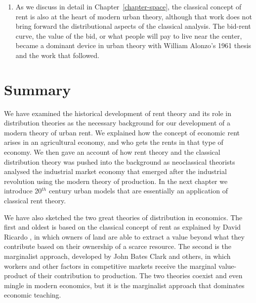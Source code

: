 \begin{enumerate}
    \item As we discuss in detail in Chapter~\ref{chapter-space}, the classical concept of rent is also at the heart of modern urban theory, although that work does not bring forward the distributional aspects of the classical analysis. The \gls{bid-rent curve}, the value of the bid, or what people will pay to live near the center, became a dominant device in urban theory with William Alonzo's 1961 thesis \cite{alonzoTheoryUrbanLand1960} and the work that followed. %
\end{enumerate}

 
\section{Summary}



We have examined the historical development  of rent theory and its role in distribution theories as the necessary background for our development of a modern theory of urban rent. We explained how the concept of economic rent arises in an agricultural economy, and who gets the rents in that type of economy. We then gave an account of how rent theory and the classical distribution theory was pushed into the background as neoclassical theorists analysed the industrial market economy that emerged after the industrial revolution using the  modern theory of production. In the next chapter we introduce 20$^{th}$ century urban models that are essentially an application of classical rent theory.


We have also sketched the  two great theories of \gls{distribution} in economics. The first and oldest is based on the classical concept of rent as explained  by David Ricardo \cite{ricardoEssayInfluenceLow1815}, in which owners of land are able to extract a value beyond what they contribute based on their ownership of a scarce resource. The second is the marginalist approach, developed by John Bates Clark and others, in which workers and other factors  in competitive markets receive the \gls{marginal value-product} of their contribution to production. The two theories coexist and even mingle in modern economics, but it is the marginalist approach that dominates economic teaching. 

